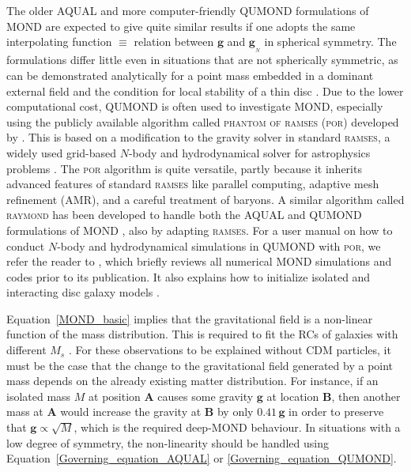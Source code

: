 \documentclass[fleqn,usenatbib,useAMS,onecolumn]{mnras} %
\begin{document}
The older AQUAL and more computer-friendly QUMOND formulations of MOND are expected to give quite similar results \citep{Candlish_2016} if one adopts the same interpolating function $\equiv$ relation between $\bm{g}$ and $\bm{g}_{_N}$ in spherical symmetry. The formulations differ little even in situations that are not spherically symmetric, as can be demonstrated analytically for a point mass embedded in a dominant external field \citep{Banik_2018_EFE} and the condition for local stability of a thin disc \citep{Banik_2018_Toomre}. Due to the lower computational cost, QUMOND is often used to investigate MOND, especially using the publicly available algorithm called \textsc{phantom of ramses} (\textsc{por}) developed by \citet{Lughausen_2015}. This is based on a modification to the gravity solver in standard \textsc{ramses}, a widely used grid-based $N$-body and hydrodynamical solver for astrophysics problems \citep{Teyssier_2002}. The \textsc{por} algorithm is quite versatile, partly because it inherits advanced features of standard \textsc{ramses} like parallel computing, adaptive mesh refinement (AMR), and a careful treatment of baryons. A similar algorithm called \textsc{raymond} has been developed to handle both the AQUAL and QUMOND formulations of MOND \citep{Candlish_2015}, also by adapting \textsc{ramses}. For a user manual on how to conduct $N$-body and hydrodynamical simulations in QUMOND with \textsc{por}, we refer the reader to \citet{Nagesh_2021}, which briefly reviews all numerical MOND simulations and codes prior to its publication. It also explains how to initialize isolated and interacting disc galaxy models \citep[the disc templates are discussed further in][]{Banik_2020_M33}.

Equation~\ref{MOND_basic} implies that the gravitational field is a non-linear function of the mass distribution. This is required to fit the RCs of galaxies with different $M_s$ \citep{Milgrom_1983}. For these observations to be explained without CDM particles, it must be the case that the change to the gravitational field generated by a point mass depends on the already existing matter distribution. For instance, if an isolated mass $M$ at position $\bm{A}$ causes some gravity $\bm{g}$ at location $\bm{B}$, then another mass at $\bm{A}$ would increase the gravity at $\bm{B}$ by only $0.41 \, \bm{g}$ in order to preserve that $\bm{g} \propto \sqrt{M}$, which is the required deep-MOND behaviour. In situations with a low degree of symmetry, the non-linearity should be handled using Equation~\ref{Governing_equation_AQUAL} or \ref{Governing_equation_QUMOND}.
\end{document}
